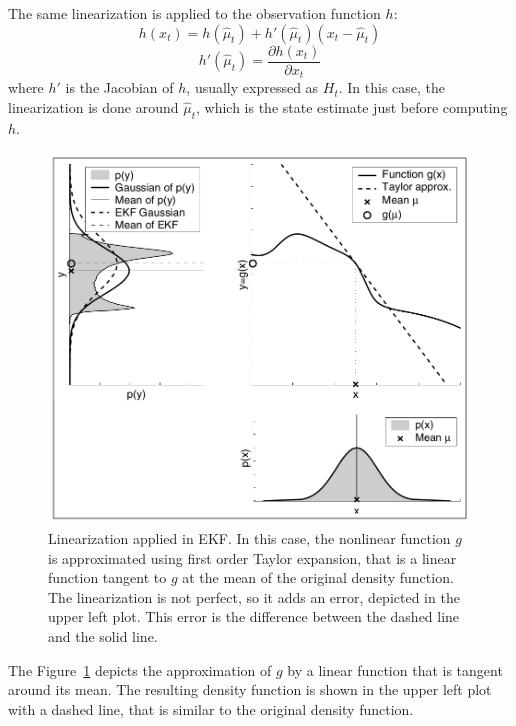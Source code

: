The same linearization is applied to the observation function $h$:
\begin{equation}
    h\left(x_t\right) = h\left(\hat\mu_t\right) + h'\left(\hat\mu_t\right)\left(x_t - \hat\mu_t\right)
\end{equation}
\begin{equation}
        h'\left(\hat\mu_t\right) = \frac{\partial h\left(x_t\right)}{\partial x_t}
\end{equation}
where $h'$ is the Jacobian of $h$, usually expressed as $H_t$. In this case, the linearization is done around $\hat\mu_t$, which is the state estimate just before computing $h$.\\

\begin{figure}[h]
    \centering
    \includegraphics{Images/fig2-ekf-linearization.png}
    \caption[Linearization applied in EKF]{Linearization applied in EKF. In this case, the nonlinear function $g$ is approximated using first order Taylor expansion, that is a linear function tangent to $g$ at the mean of the original density function. The linearization is not perfect, so it adds an error, depicted in the upper left plot. This error is the difference between the dashed line and the solid line. \cite{prob-robotics}}
    \label{fig:chapter1:kf:ekf:ekf-linearization}
\end{figure}

The Figure~\ref{fig:chapter1:kf:ekf:ekf-linearization} depicts the approximation of $g$ by a linear function that is tangent around its mean. The resulting density function is shown in the upper left plot with a dashed line, that is similar to the original density function.\\

